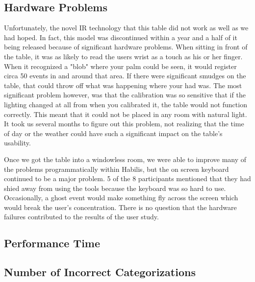 \documentclass{article}
\begin{document}
\subsection*{Hardware Problems}
Unfortunately, the novel IR technology that this table did not work as well as we had hoped.  In fact, this model was discontinued within a year and a half of it being released because of significant hardware problems.  When sitting in front of the table, it was as likely to read the users wrist as a touch as his or her finger.  When it recognized a "blob" where your palm could be seen, it would register circa 50 events in and around that area.  If there were significant smudges on the table, that could throw off what was happening where your had was.  The most significant problem however, was that the calibration was so sensitive that if the lighting changed at all from when you calibrated it, the table would not function correctly.  This meant that it could not be placed in any room with natural light.  It took us several months to figure out this problem, not realizing that the time of day or the weather could have such a significant impact on the table's usability.  

Once we got the table into a windowless room, we were able to improve many of the problems programmatically within Habilis, but the on screen keyboard continued to be a major problem.  5 of the 8 participants mentioned that they had shied away from using the tools because the keyboard was so hard to use.  Occasionally, a ghost event would make something fly across the screen which would break the user's concentration.  There is no question that the hardware failures contributed to the results of the user study.      
\subsection*{Performance Time}
\subsection*{Number of Incorrect Categorizations}
\end{document}
